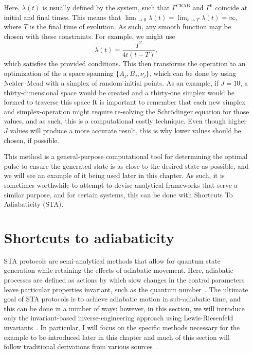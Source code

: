 \noindent Here, $\lambda(t)$ is usually defined by the system, such that $\Gamma^{\text{CRAB}}$ and $\Gamma^0$ coincide at initial and final times.
This means that $\lim_{t\rightarrow 0} \lambda(t) = \lim_{t\rightarrow T}\lambda(t) = \infty$, where $T$ is the final time of evolution.
As such, any smooth function may be chosen with these constraints.
For example, we might use
\begin{equation}
\lambda(t) = \frac{T^2}{4t(t-T)},
\end{equation}
\noindent which satisfies the provided conditions.
This then transforms the operation to an optimization of the a space spanning $\{A_j, B_j, \nu_j\}$, which can be done by using Nelder--Mead with a simplex of random initial points.
As an example, if $J = 10$, a thirty-dimensional space would be created and a thirty-one simplex would be formed to traverse this space
It is important to remember that each new simplex and simplex-operation might require re-solving the Schr\"odinger equation for those values, and as such, this is a computational costly technique.
Even though higher $J$ values will produce a more accurate result, this is why lower values should be chosen, if possible.

This method is a general-purpose computational tool for determining the optimal pulse to ensure the generated state is as close to the desired state as possible, and we will see an example of it being used later in this chapter.
As such, it is sometimes worthwhile to attempt to devise analytical frameworks that serve a similar purpose, and for certain systems, this can be done with Shortcuts To Adiabaticity (STA).

\section{Shortcuts to adiabaticity}

STA protocols are semi-analytical methods that allow for quantum state generation while retaining the effects of adiabatic movement.
Here, adiabatic processes are defined as actions by which slow changes in the control parameters leave particular properties invariant, such as the quantum number~\cite{guery2019}.
The ultimate goal of STA protocols is to achieve adiabatic motion in sub-adiabatic time, and this can be done in a number of ways; however, in this section, we will introduce only the invariant-based inverse-engineering approach using Lewis-Riesenfeld invariants~\cite{torrontegui2013}.
In particular, I will focus on the specific methods necessary for the example to be introduced later in this chapter and much of this section will follow traditional derivations from various sources~\cite{torrontegui2013,guery2019, schloss2016}.

